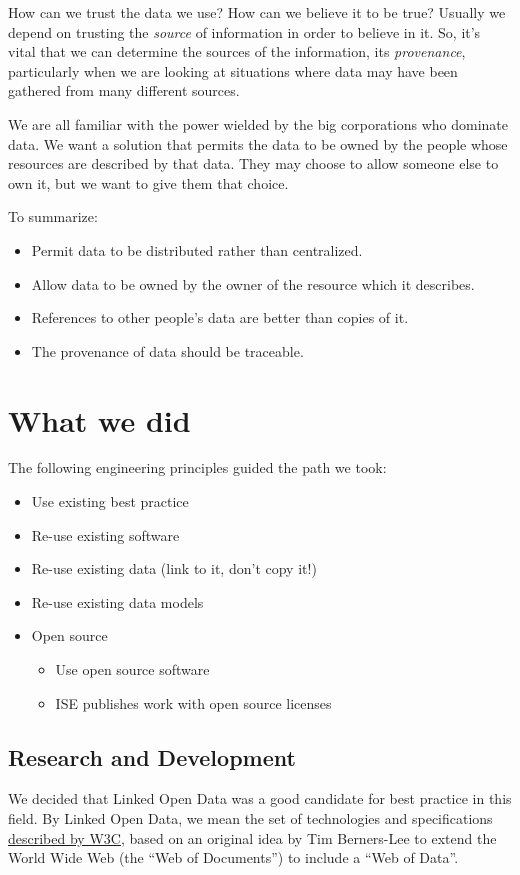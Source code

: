 \documentclass[11pt,twoside,a4paper]{article}
\begin{document}
How can we trust the data we use? How can we believe it to be true?
Usually we depend on trusting the \textit{source} of information in order to believe in it.
So, it's vital that we can determine the sources of the information,
its \textit{provenance},
particularly when we are looking at situations where data may have been gathered from many different sources.

We are all familiar with the power wielded by the big corporations who dominate data.
We want a solution that permits the data to be owned by the people whose resources are described by that data.
They may choose to allow someone else to own it, but we want to give them that choice.

To summarize:
\begin{itemize}
  \item Permit data to be distributed rather than centralized.
  \item Allow data to be owned by the owner of the resource which it describes.
  \item References to other people's data are better than copies of it.
  \item The provenance of data should be traceable.  
\end{itemize}

\section*{What we did}
The following engineering principles guided the path we took:
  \begin{itemize}
    \item Use existing best practice
    \item Re-use existing software
    \item Re-use existing data (link to it, don't copy it!)
    \item Re-use existing data models
    \item Open source
      \begin{itemize}
	\item Use open source software
	\item ISE publishes work with open source licenses
      \end{itemize}
  \end{itemize}

\subsection*{Research and Development}
We decided that Linked Open Data was a good candidate for best practice in this field.
By Linked Open Data, we mean the set of technologies and specifications \href{https://www.w3.org/standards/semanticweb/data}{described by W3C}, based on an original idea by Tim Berners-Lee to extend the World Wide Web (the ``Web of Documents'') to include a ``Web of Data''. 
\end{document}
